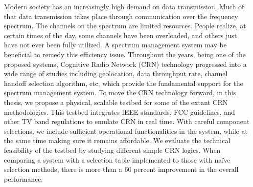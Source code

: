 Modern society has an increasingly high demand on data transmission. Much of that data transmission takes place through communication over the frequency spectrum. The channels on the spectrum are limited resources. People realize, at certain times of the day, some channels have been overloaded, and others just have not ever been fully utilized. A spectrum management system may be beneficial to remedy this efficiency issue. Throughout the years, being one of the proposed systems, Cognitive Radio Network (CRN) technology progressed into a wide range of studies including geolocation, data throughput rate, channel handoff selection algorithm, etc, which provide the fundamental support for the spectrum management system. To move the CRN technology forward, in this thesis, we propose a physical, scalable testbed for some of the extant CRN methodologies. This testbed integrates IEEE standards, FCC guidelines, and other TV band regulations to emulate CRN in real time. With careful component selections, we include sufficient operational functionalities in the system, while at the same time making sure it remains affordable. We evaluate the technical feasibility of the testbed by studying different simple CRN logics. When comparing a system with a selection table implemented to those with na\"ive selection methods, there is more than a 60 percent improvement in the overall performance.

